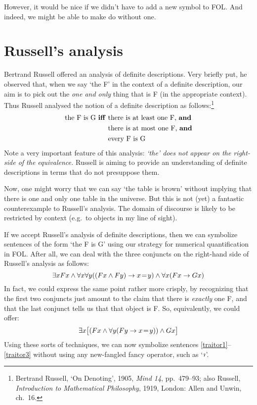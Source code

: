 However, it would be nice if we didn't have to add a new symbol to FOL. And indeed, we might be able to make do without one.

\section{Russell's analysis}
Bertrand Russell offered an analysis of definite descriptions. Very briefly put, he observed that, when we say `the F' in the context of a definite description, our aim is to pick out the \emph{one and only} thing that is F (in the appropriate context). Thus Russell analysed the notion of a definite description as follows:\footnote{Bertrand Russell, `On Denoting', 1905, \emph{Mind 14}, pp.\ 479--93; also Russell, \emph{Introduction to Mathematical Philosophy}, 1919, London: Allen and Unwin, ch.\ 16.}
	\begin{align*}
		\text{the F is G \textbf{iff} }&\text{there is at least one F, \emph{and}}\\
	&\text{there is at most one F, \emph{and}}\\	
	&\text{every F is G}
\end{align*}
Note a very important feature of this analysis: \emph{`the' does not appear on the right-side of the equivalence.} Russell is aiming to provide an understanding of definite descriptions in terms that do not presuppose them. 

Now, one might worry that we can say `the table is brown' without implying that there is one and only one table in the universe. But this is not (yet) a fantastic counterexample to Russell's analysis. The domain of discourse is likely to be restricted by context (e.g.\ to objects in my line of sight).

If we accept Russell's analysis of definite descriptions, then we can symbolize sentences of the form `the F is G' using our strategy for numerical quantification in FOL. After all, we can deal with the three conjuncts on the right-hand side of Russell's analysis as follows:
	$$\exists x Fx \eand \forall x \forall y ((Fx \eand Fy) \eif x \eid y) \eand \forall x (Fx \eif Gx)$$
In fact, we could express the same point rather more crisply, by recognizing that the first two conjuncts just amount to the claim that there is \emph{exactly} one F, and that the last conjunct tells us that that object is F. So, equivalently, we could offer:
	$$\exists x \bigl[(Fx \eand \forall y (Fy \eif x \eid y)) \eand Gx\bigr]$$
Using these sorts of techniques, we can now symbolize sentences \ref{traitor1}--\ref{traitor3} without using any new-fangled fancy operator, such as `$\maththe$'. 

